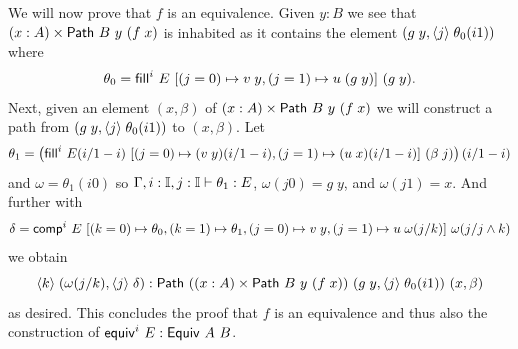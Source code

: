 We will now prove that $f$ is an equivalence. Given $y : B$ we see
that $(x : A) \times {\sf Path}~B~y~(f \; x)$ is inhabited as it contains
the element $(g \; y, {\langle}j{\rangle} \; \theta_0 (i1))$ where
\[
\theta_0 =%
\Comp^i~E~[(j=0) \mapsto v \; y,(j=1) \mapsto u \; (g \; y)]~(g \; y).
\]
Next, given an element $(x,\beta)$ of $(x : A) \times {\sf Path}~B~y~(f \;
x)$ we will construct a path from $(g \; y, {\langle}j{\rangle} \; \theta_0 (i1))$ to
$(x,\beta)$.  Let
\[
\theta_1 =%
\left(\Comp^i~{E \subst i {1-i}}~[(j=0) \mapsto (v \; y) \subst i {1-i}, %
(j=1) \mapsto (u \; x) \subst i {1-i}]~(\beta \; j) \right)\subst i {1-i}
\]
and $\omega = \theta_1 (i0)$ so $\Gamma, i : \mathbb{I}, j : \mathbb{I} \vdash
\theta_1 : E$, $\omega (j0) = g \; y$, and $\omega (j1) = x$.  And
further with
\[
\delta = %
\comp^i~E~%
[ (k=0) \mapsto \theta_0%
, (k=1) \mapsto \theta_1%
, (j=0) \mapsto v \; y%
, (j=1) \mapsto u \; \omega \subst j k%
]~%
\omega \subst j {j \land k}
\]
we obtain
\[
\pabs k (\omega \subst j k, \pabs j \delta) : %
\Path~((x:A) \times \Path~B~y~(f \; x))~(g \; y, \pabs j
\theta_0 (i1))~(x,\beta)
\]
as desired. This concludes the proof that $f$ is an equivalence and
thus also the construction of ${\sf equiv}^i~E : {\sf Equiv}~A~B$.


